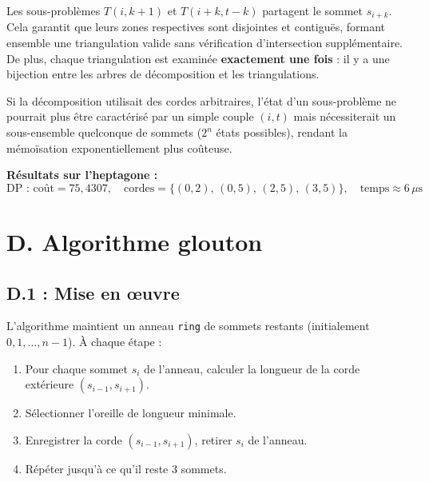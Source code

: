 \documentclass[12pt,a4paper]{article}
\begin{document}
Les sous-problèmes $T(i, k+1)$ et $T(i+k, t-k)$ partagent le sommet $s_{i+k}$. Cela
garantit que leurs zones respectives sont disjointes et contiguës, formant ensemble une
triangulation valide sans vérification d'intersection supplémentaire. De plus, chaque
triangulation est examinée \textbf{exactement une fois} : il y a une bijection entre les
arbres de décomposition et les triangulations.

Si la décomposition utilisait des cordes arbitraires, l'état d'un sous-problème ne pourrait
plus être caractérisé par un simple couple $(i, t)$ mais nécessiterait un sous-ensemble
quelconque de sommets ($2^n$ états possibles), rendant la mémoïsation exponentiellement
plus coûteuse.

\textbf{Résultats sur l'heptagone :}
\[
  \text{DP : coût} = 75{,}4307,\quad
  \text{cordes} = \{(0,2),\,(0,5),\,(2,5),\,(3,5)\},\quad
  \text{temps} \approx 6\,\mu\text{s}
\]

\clearpage
\section{D. Algorithme glouton}

\subsection{D.1 : Mise en \oe uvre}

L'algorithme maintient un anneau \texttt{ring} de sommets restants (initialement
$0, 1, \ldots, n-1$). À chaque étape :

\begin{enumerate}
  \item Pour chaque sommet $s_i$ de l'anneau, calculer la longueur de la corde extérieure
        $(s_{i-1}, s_{i+1})$.
  \item Sélectionner l'oreille de longueur minimale.
  \item Enregistrer la corde $(s_{i-1}, s_{i+1})$, retirer $s_i$ de l'anneau.
  \item Répéter jusqu'à ce qu'il reste 3 sommets.
\end{enumerate}
\end{document}
